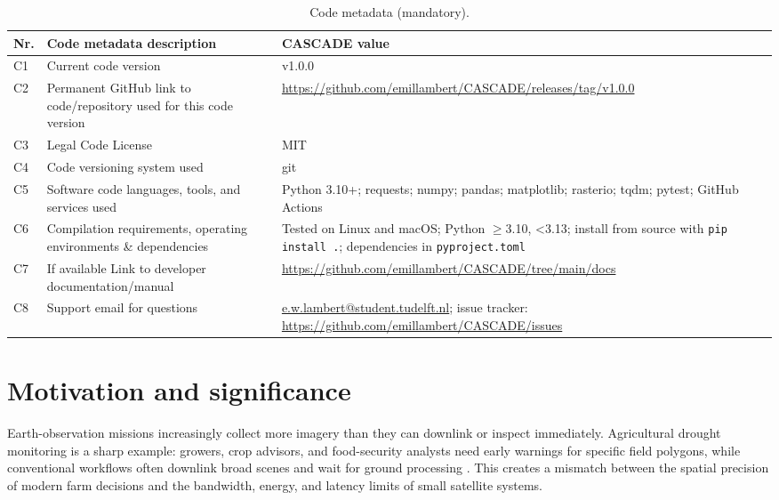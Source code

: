 \documentclass[preprint,12pt,a4paper]{elsarticle}
\begin{document}
\begin{table}[!h]
\small
\setlength{\tabcolsep}{3pt}
\begin{tabular}{|l|p{5.3cm}|p{6.4cm}|}
\hline
\textbf{Nr.} & \textbf{Code metadata description} & \textbf{CASCADE value} \\
\hline
C1 & Current code version & v1.0.0 \\
\hline
C2 & Permanent GitHub link to code/repository used for this code version & \url{https://github.com/emillambert/CASCADE/releases/tag/v1.0.0} \\
\hline
C3 & Legal Code License & MIT \\
\hline
C4 & Code versioning system used & git \\
\hline
C5 & Software code languages, tools, and services used & Python 3.10+; requests; numpy; pandas; matplotlib; rasterio; tqdm; pytest; GitHub Actions \\
\hline
C6 & Compilation requirements, operating environments \& dependencies & Tested on Linux and macOS; Python $\geq$3.10, \textless 3.13; install from source with \texttt{pip install .}; dependencies in \texttt{pyproject.toml} \\
\hline
C7 & If available Link to developer documentation/manual & \url{https://github.com/emillambert/CASCADE/tree/main/docs} \\
\hline
C8 & Support email for questions & \href{mailto:e.w.lambert@student.tudelft.nl}{e.w.lambert@student.tudelft.nl}; issue tracker: \url{https://github.com/emillambert/CASCADE/issues} \\
\hline
\end{tabular}
\caption{Code metadata (mandatory).}
\end{table}

\section{Motivation and significance}

Earth-observation missions increasingly collect more imagery than they can downlink or inspect immediately. Agricultural drought monitoring is a sharp example: growers, crop advisors, and food-security analysts need early warnings for specific field polygons, while conventional workflows often downlink broad scenes and wait for ground processing \cite{mishra-singh-2010}. This creates a mismatch between the spatial precision of modern farm decisions and the bandwidth, energy, and latency limits of small satellite systems.
\end{document}
